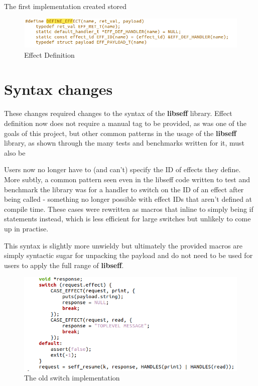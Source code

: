 \documentclass[logo,bsc,singlespacing,parskip,online]{infthesis}
\begin{document}
The first implementation created stored 

\begin{figure}[ht]
    \centering
    \includegraphics[width=1\linewidth]{defeff.png}
    \caption{Effect Definition}
    \label{fig:joooo}
\end{figure}

\section{Syntax changes} \label{Syntax}

These changes required changes to the syntax of the \textbf{libseff} library. Effect definition now does not require a manual tag to be provided, as was one of the goals of this project, but other common patterns in the usage of the \textbf{libseff} library, as shown through the many tests and benchmarks written for it, must also be 

Users now no longer have to (and can't) specify the ID of effects they define. More subtly, a common pattern seen even in the libseff code written to test and benchmark the library was for a handler to switch on the ID of an effect after being called - something no longer possible with effect IDs that aren't defined at compile time. These cases were rewritten as macros that inline to simply being if statements instead, which is less efficient for large switches but unlikely to come up in practise.

This syntax is slightly more unwieldy but ultimately the provided macros are simply syntactic sugar for unpacking the payload and do not need to be used for users to apply the full range of \textbf{libseff}. 

\begin{figure}[ht]
    \centering
    \includegraphics[width=1\linewidth]{oldswitch.png}
    \caption{The old switch implementation}
    \label{fig:oldswitch}
\end{figure}
\end{document}

